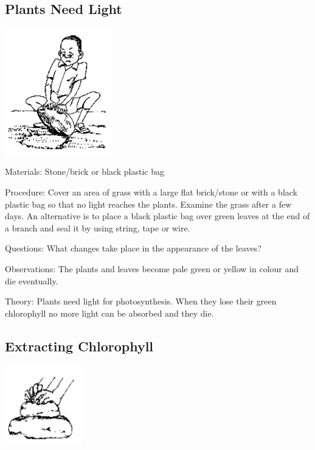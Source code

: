 \begin{multicols}{2}
\subsection{Plants Need Light} %

\begin{center}
\includegraphics[width=0.35\textwidth]{./img/source/plants-light.png}
\end{center}

\begin{description*}
\item[Materials:]{Stone/brick or black plastic bag}
\item[Procedure:]{Cover an area of grass with a large flat brick/stone or with a black plastic bag so that no
light reaches the plants. Examine the grass after a few days. An alternative is to place a black
plastic bag over green leaves at the end of a branch and seal it by using string, tape or wire.}
\item[Questions:]{What changes take place in the appearance of the leaves?}
\item[Observations:]{The plants and leaves become pale green or yellow in colour and die eventually.}
\item[Theory:]{Plants need light for photosynthesis. When they lose their green chlorophyll no more light
can be absorbed and they die.}
\end{description*}

\subsection{Extracting Chlorophyll} %

\begin{center}
\includegraphics[width=0.25\textwidth]{./img/source/chlorophyll-extract.png}
\end{center}


\end{multicols}
